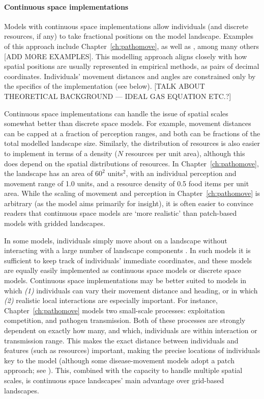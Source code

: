 \paragraph*{Continuous space implementations}

Models with continuous space implementations allow individuals (and discrete resources, if any) to take fractional positions on the model landscape.
Examples of this approach include Chapter~\ref{ch:pathomove}, as well as \citet{spiegel2016,spiegel2017}, among many others [ADD MORE EXAMPLES].
This modelling approach aligns closely with how spatial positions are usually represented in empirical methods, as pairs of decimal coordinates.
Individuals' movement distances and angles are constrained only by the specifics of the implementation (see below).
[TALK ABOUT THEORETICAL BACKGROUND --- IDEAL GAS EQUATION ETC.?]

Continuous space implementations can handle the issue of spatial scales somewhat better than discrete space models.
For example, movement distances can be capped at a fraction of perception ranges, and both can be fractions of the total modelled landscape size.
Similarly, the distribution of resources is also easier to implement in terms of a density ($N$ resources per unit area), although this does depend on the spatial distributions of resources.
In Chapter~\ref{ch:pathomove}, the landscape has an area of $60^2$ units$^2$, with an individual perception and movement range of 1.0 units, and a resource density of 0.5 food items per unit area.
While the scaling of movement and perception in Chapter~\ref{ch:pathomove} is arbitrary (as the model aims primarily for insight), it is often easier to convince readers that continuous space models are `more realistic' than patch-based models with gridded landscapes.

In some models, individuals simply move about on a landscape without interacting with a large number of landscape components \citep[see some models in][]{spiegel2017}.
In such models it is sufficient to keep track of individuals' immediate coordinates, and these models are equally easily implemented as continuous space models or discrete space models.
Continuous space implementations may be better suited to models in which \textit{(1)} individuals can vary their movement distance and heading, or in which \textit{(2)} realistic local interactions are especially important.
For instance, Chapter~\ref{ch:pathomove} models two small-scale processes: exploitation competition, and pathogen transmission.
Both of these processes are strongly dependent on exactly how many, and which, individuals are within interaction or transmission range.
This makes the exact distance between individuals and features (such as resources) important, making the precise locations of individuals key to the model (although some disease-movement models adopt a patch approach; see \citealt{white2018,white2018b,jeltschf.1997}).
This, combined with the capacity to handle multiple spatial scales, is continuous space landscapes' main advantage over grid-based landscapes.

